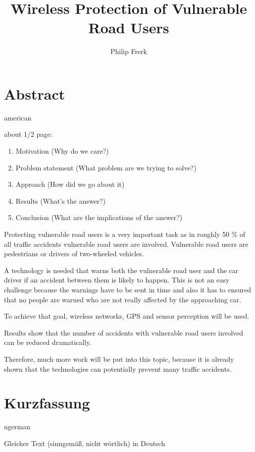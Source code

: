\documentclass[]{ccs-thesis}
\author{Philip Frerk}
\title{Wireless Protection of Vulnerable Road Users}
\begin{document}

\maketitle

\chapter*{Abstract}
\begin{otherlanguage*}{american}

about 1/2 page:
\begin{enumerate}
	\item Motivation (Why do we care?)
	\item Problem statement (What problem are we trying to solve?)
	\item Approach (How did we go about it)
	\item Results (What's the answer?)
	\item Conclusion (What are the implications of the answer?)
\end{enumerate}

Protecting vulnerable road users is a very important task as in roughly 50 \% of all traffic accidents vulnerable road users are involved. Vulnerable road users are pedestrians or drivers of two-wheeled vehicles.

A technology is needed that warns both the vulnerable road user and the car driver if an accident between them is likely to happen.  This is not an easy challenge because the warnings have to be sent in time  and also it has to ensured that no people are warned who are not really affected by the approaching car.

To achieve that goal, wireless networks, GPS and sensor perception will be used.

Results show that the number of accidents with vulnerable road users involved can be reduced dramatically.

Therefore, much more work will be put into this topic, because it is already shown that the technologies can potentially prevent many traffic accidents.

\end{otherlanguage*}


\chapter*{Kurzfassung}
\begin{otherlanguage*}{ngerman}

Gleicher Text (sinngemäß, nicht wörtlich) in Deutsch

\end{otherlanguage*}
\acresetall
\end{document}
